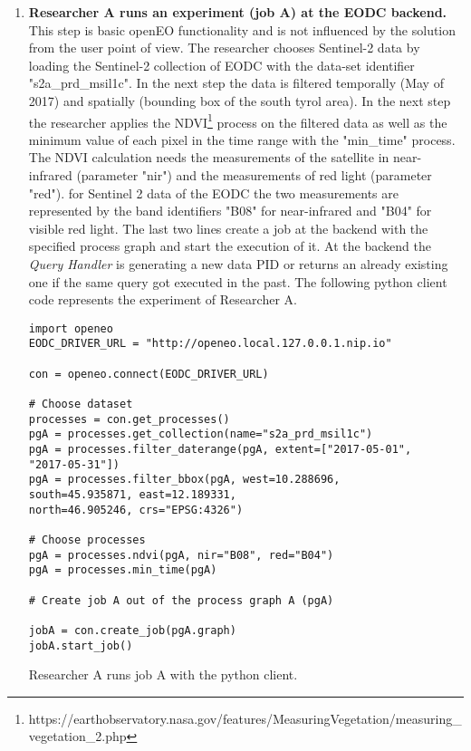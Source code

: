 \documentclass[draft,final]{vutinfth} %
\newenvironment{code}{\captionsetup{type=listing}}{}
\begin{document}
\begin{enumerate}
	\item \textbf{Researcher A runs an experiment (job A) at the EODC backend.} \\
	This step is basic openEO functionality and is not influenced by the solution from the user point of view. The researcher chooses Sentinel-2 data by loading the Sentinel-2 collection of EODC with the data-set identifier "s2a\_prd\_msil1c". In the next step the data is filtered temporally (May of 2017) and spatially (bounding box of the south tyrol area). In the next step the researcher applies the NDVI\footnote{https://earthobservatory.nasa.gov/features/MeasuringVegetation/measuring\_vegetation\_2.php} process on the filtered data as well as the minimum value of each pixel in the time range with the "min\_time" process. The NDVI calculation needs the measurements of the satellite in near-infrared (parameter "nir") and the measurements of red light (parameter "red"). for Sentinel 2 data of the EODC the two measurements are represented by the band identifiers "B08" for near-infrared and "B04" for visible red light. The last two lines create a job at the backend with the specified process graph and start the execution of it.
	At the backend the \textit{Query Handler} is generating a new data PID or returns an already existing one if the same query got executed in the past. The following python client code represents the experiment of Researcher A.
	
\begin{code}
	\begin{verbatim}
import openeo
EODC_DRIVER_URL = "http://openeo.local.127.0.0.1.nip.io"

con = openeo.connect(EODC_DRIVER_URL)

# Choose dataset
processes = con.get_processes()
pgA = processes.get_collection(name="s2a_prd_msil1c")
pgA = processes.filter_daterange(pgA, extent=["2017-05-01", 
"2017-05-31"])
pgA = processes.filter_bbox(pgA, west=10.288696, 
south=45.935871, east=12.189331, 
north=46.905246, crs="EPSG:4326")

# Choose processes
pgA = processes.ndvi(pgA, nir="B08", red="B04")
pgA = processes.min_time(pgA)

# Create job A out of the process graph A (pgA)

jobA = con.create_job(pgA.graph)
jobA.start_job()
	\end{verbatim}
	\caption{Researcher A runs job A with the python client.}
	\label{lst:impl_usecase1_1}
\end{code}	


\end{enumerate}
\end{document}
